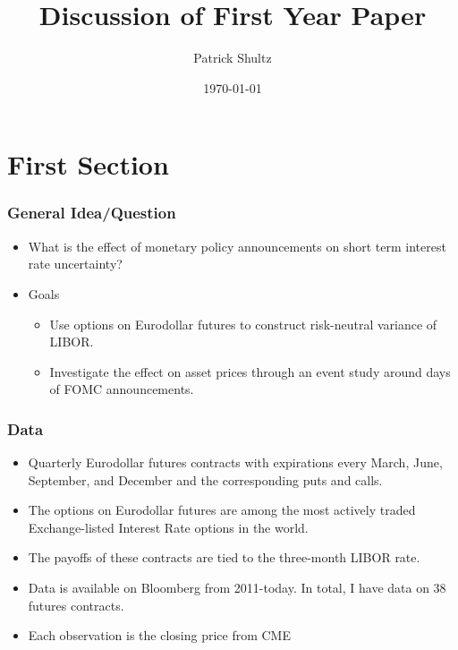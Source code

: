 \documentclass{beamer}
\title[]{Discussion of First Year Paper} %
\author{Patrick Shultz} %
\date{\today} %
\begin{document}


\section{First Section} %

\begin{frame}
\frametitle{General Idea/Question}
\begin{itemize}
\item What is the effect of monetary policy announcements on short term interest rate uncertainty? 
\item Goals
\begin{itemize}
	\item Use options on Eurodollar futures to construct risk-neutral variance of LIBOR. 
	\item Investigate the effect on asset prices through an event study around days of FOMC announcements. 
\end{itemize}
\end{itemize}
\end{frame}


\begin{frame}
\frametitle{Data}
\begin{itemize}
	\item Quarterly Eurodollar futures contracts with expirations every March, June, September, and December and the corresponding puts and calls.
	\item The options on Eurodollar futures are among the most actively traded Exchange-listed Interest Rate options in the world. 
	\item The payoffs of these contracts are tied to the three-month LIBOR rate. 
	\item Data is available on Bloomberg from 2011-today. In total, I have data on 38 futures contracts. 
	\item Each observation is the closing price from CME
\end{itemize}

\end{frame}
\end{document}
